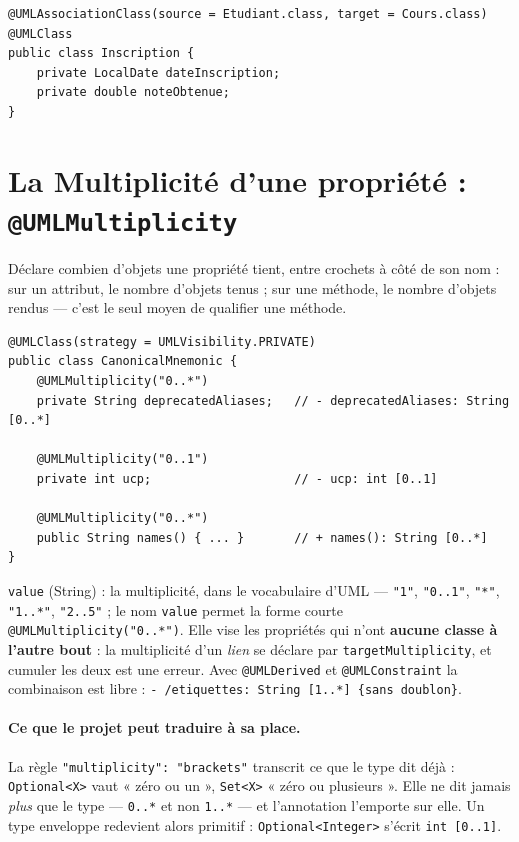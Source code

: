 \documentclass[12pt, a4paper]{article}
\begin{document}
\begin{lstlisting}
@UMLAssociationClass(source = Etudiant.class, target = Cours.class)
@UMLClass
public class Inscription {
    private LocalDate dateInscription;
    private double noteObtenue;
}
\end{lstlisting}

\section{La Multiplicité d'une propriété : \texttt{@UMLMultiplicity}}
\label{sec:multiplicite}

Déclare combien d'objets une propriété tient, entre crochets à côté de son nom : sur un attribut, le nombre d'objets tenus ; sur une méthode, le nombre d'objets rendus --- c'est le seul moyen de qualifier une méthode.

\begin{lstlisting}
@UMLClass(strategy = UMLVisibility.PRIVATE)
public class CanonicalMnemonic {
    @UMLMultiplicity("0..*")
    private String deprecatedAliases;   // - deprecatedAliases: String [0..*]

    @UMLMultiplicity("0..1")
    private int ucp;                    // - ucp: int [0..1]

    @UMLMultiplicity("0..*")
    public String names() { ... }       // + names(): String [0..*]
}
\end{lstlisting}

\texttt{value} (String) : la multiplicité, dans le vocabulaire d'UML --- \texttt{"1"}, \texttt{"0..1"}, \texttt{"*"}, \texttt{"1..*"}, \texttt{"2..5"} ; le nom \texttt{value} permet la forme courte \texttt{@UMLMultiplicity("0..*")}. Elle vise les propriétés qui n'ont \textbf{aucune classe à l'autre bout} : la multiplicité d'un \textit{lien} se déclare par \texttt{targetMultiplicity}, et cumuler les deux est une erreur. Avec \texttt{@UMLDerived} et \texttt{@UMLConstraint} la combinaison est libre : \texttt{- /etiquettes: String [1..*] \{sans doublon\}}.

\paragraph{Ce que le projet peut traduire à sa place.} La règle \texttt{"multiplicity": "brackets"} transcrit ce que le type dit déjà : \texttt{Optional<X>} vaut « zéro ou un », \texttt{Set<X>} « zéro ou plusieurs ». Elle ne dit jamais \textit{plus} que le type --- \texttt{0..*} et non \texttt{1..*} --- et l'annotation l'emporte sur elle. Un type enveloppe redevient alors primitif : \texttt{Optional<Integer>} s'écrit \texttt{int [0..1]}.
\end{document}
